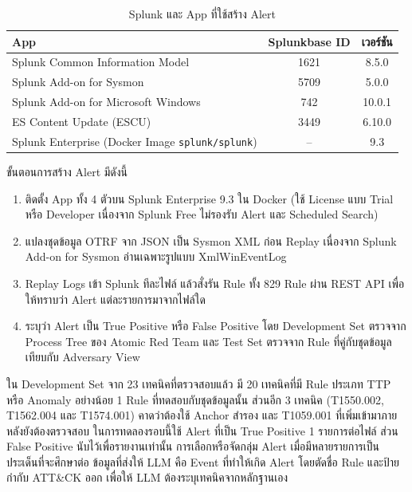 \begin{table}[ht]
  \centering
  \caption{Splunk และ App ที่ใช้สร้าง Alert}
  \label{tab:splunk-apps}
  \small
  \begin{tabular}{|l|c|c|}
    \hline
    \textbf{App} & \textbf{Splunkbase ID} & \textbf{เวอร์ชัน} \\ \hline
    Splunk Common Information Model & 1621 & 8.5.0 \\ \hline
    Splunk Add-on for Sysmon & 5709 & 5.0.0 \\ \hline
    Splunk Add-on for Microsoft Windows & 742 & 10.0.1 \\ \hline
    ES Content Update (ESCU) & 3449 & 6.10.0 \\ \hline
    Splunk Enterprise (Docker Image \texttt{splunk/splunk}) & -- & 9.3 \\ \hline
  \end{tabular}
\end{table}

ขั้นตอนการสร้าง Alert มีดังนี้
\begin{enumerate}
  \item ติดตั้ง App ทั้ง 4 ตัวบน Splunk Enterprise 9.3 ใน Docker (ใช้ License แบบ Trial หรือ Developer
        เนื่องจาก Splunk Free ไม่รองรับ Alert และ Scheduled Search)
  \item แปลงชุดข้อมูล OTRF จาก JSON เป็น Sysmon XML ก่อน Replay
        เนื่องจาก Splunk Add-on for Sysmon อ่านเฉพาะรูปแบบ XmlWinEventLog
  \item Replay Logs เข้า Splunk ทีละไฟล์ แล้วสั่งรัน Rule ทั้ง 829 Rule ผ่าน REST API
        เพื่อให้ทราบว่า Alert แต่ละรายการมาจากไฟล์ใด
  \item ระบุว่า Alert เป็น True Positive หรือ False Positive
        โดย Development Set ตรวจจาก Process Tree ของ Atomic Red Team
        และ Test Set ตรวจจาก Rule ที่คู่กับชุดข้อมูลเทียบกับ Adversary View
\end{enumerate}

ใน Development Set จาก 23 เทคนิคที่ตรวจสอบแล้ว มี 20 เทคนิคที่มี Rule ประเภท TTP หรือ Anomaly อย่างน้อย 1 Rule
ที่ทดสอบกับชุดข้อมูลนั้น ส่วนอีก 3 เทคนิค (T1550.002, T1562.004 และ T1574.001) คาดว่าต้องใช้ Anchor สำรอง
และ T1059.001 ที่เพิ่มเข้ามาภายหลังยังต้องตรวจสอบ
ในการทดลองรอบนี้ใช้ Alert ที่เป็น True Positive 1 รายการต่อไฟล์ ส่วน False Positive นับไว้เพื่อรายงานเท่านั้น
การเลือกหรือจัดกลุ่ม Alert เมื่อมีหลายรายการเป็นประเด็นที่จะศึกษาต่อ
ข้อมูลที่ส่งให้ LLM คือ Event ที่ทำให้เกิด Alert โดยตัดชื่อ Rule และป้ายกำกับ ATT\&CK ออก
เพื่อให้ LLM ต้องระบุเทคนิคจากหลักฐานเอง

